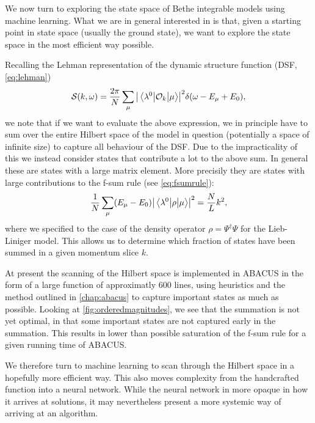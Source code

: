 \documentclass[11pt, a4paper]{report} %
\begin{document}
We now turn to exploring the state space of Bethe integrable models using machine learning.
What we are in general interested in is that, given a starting point in state space (usually the ground state), we want to explore the state space in the most efficient way possible.

Recalling the Lehman representation of the dynamic structure function (DSF, \cref{eq:lehman})
\begin{equation}
  \mathcal{S}(k,\omega) = \frac{2\pi}{N}\sum_{\mu}\abs{\mel{\lambda^0}{\mathcal{O}_k}{\mu}}^2 \delta(\omega-E_{\mu}+E_0), 
\end{equation}
we note that if we want to evaluate the above expression, we in principle have to sum over the entire Hilbert space of the model in question (potentially a space of  infinite size) to capture all behaviour of the DSF.
Due to the impracticality of this we instead consider states that contribute a lot to the above sum.
In general these are states with a large matrix element.
More precisily they are states with large contributions to the f-sum rule (see \cref{eq:fsumrule}):
\begin{align}
  \frac{1}{N}\sum_{\mu}(E_{\mu}-E_0)\abs{\mel{\lambda^0}{\rho}{\mu}}^2  = \frac{N}{L} k^2,
\end{align}
where we specified to the case of the density operator \(\rho = \Psi^{\dag}\Psi\) for the Lieb-Liniger model.
This allows us to determine which fraction of states have been summed in a given momentum slice \(k\).

At present the scanning of the Hilbert space is implemented in ABACUS in the form of a large function of approximatly 600 lines, using heuristics and the method outlined in \cref{chap:abacus} to capture important states as much as possible.
Looking at \cref{fig:orderedmagnitudes}, we see that the summation is not yet optimal, in that some important states are not captured early in the summation.
This results in lower than possible saturation of the f-sum rule for a given running time of ABACUS.

We therefore turn to machine learning to scan through the Hilbert space in a hopefully more efficient way.
This also moves complexity from the handcrafted function into a neural network.
While the neural network in more opaque in how it arrives at solutions, it may nevertheless present a more systemic way of arriving at an algorithm.
\end{document}
